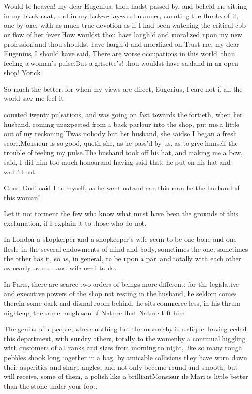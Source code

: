 \documentclass[twoside]{article}
\begin{document}
\tsk Would to heaven! my dear Eugenius, thou hadst passed by, and beheld me
sitting in my black coat, and in my lack-a-day-sical manner, counting the
throbs of it, one by one, with as much true devotion as if I had been
watching the critical ebb or flow of her fever.\tsk How wouldst thou have
laugh’d and moralized upon my new profession!\tsk and thou shouldst have
laugh’d and moralized on.\tsk Trust me, my dear Eugenius, I should have said,
\lqq There are worse occupations in this world \i{than feeling a woman’s
pulse}.\rqq\tsk But a grisette’s! thou wouldst have said\tsk and in an open shop!
Yorick\tsk 

\tsk So much the better: for when my views are direct, Eugenius, I care not
if all the world saw me feel it.






 counted twenty pulsations, and was going on fast towards the
fortieth, when her husband, coming unexpected from a back parlour into
the shop, put me a little out of my reckoning.\tsk ’Twas nobody but her
husband, she said\tsk so I began a fresh score.\tsk Monsieur is so good, quoth
she, as he pass’d by us, as to give himself the trouble of feeling my
pulse.\tsk The husband took off his hat, and making me a bow, said, I did him
too much honour\tsk and having said that, he put on his hat and walk’d out.

Good God! said I to myself, as he went out\tsk and can this man be the
husband of this woman!

Let it not torment the few who know what must have been the grounds of
this exclamation, if I explain it to those who do not.

In London a shopkeeper and a shopkeeper’s wife seem to be one bone and
one flesh: in the several endowments of mind and body, sometimes the one,
sometimes the other has it, so as, in general, to be upon a par, and
totally with each other as nearly as man and wife need to do.

In Paris, there are scarce two orders of beings more different: for the
legislative and executive powers of the shop not resting in the husband,
he seldom comes there\tsk in some dark and dismal room behind, he sits
commerce-less, in his thrum nightcap, the same rough son of Nature that
Nature left him.

The genius of a people, where nothing but the monarchy is \i{salique},
having ceded this department, with sundry others, totally to the
women\tsk by a continual higgling with customers of all ranks and sizes from
morning to night, like so many rough pebbles shook long together in a
bag, by amicable collisions they have worn down their asperities and
sharp angles, and not only become round and smooth, but will receive,
some of them, a polish like a brilliant\tsk Monsieur \i{le Mari} is little
better than the stone under your foot.
\end{document}
